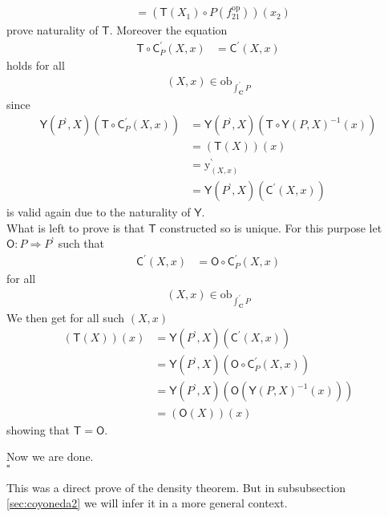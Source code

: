 \begin{prf}
\begin{description}
\begin{align*}
  \\
  &=
  \left(
    \mathsf{T}(X_{1})
    \circ
    P(f_{21}^{\mathrm{op}})
  \right)
  (x_{2})
\end{align*}
prove naturality of $\mathsf{T}$. Moreover the equation
\begin{align*}
  \mathsf{T}
  \circ
  \mathsf{C}_{P}^{\prime}(X,x)
  &=
  \mathsf{C}^{\prime}(X,x)
\end{align*}
holds for all
\begin{align*}
  (X,x)
  \in
  \mathrm{ob}_{\int_{\mathbf{C}}^{\prime}P}
\end{align*}
since
\begin{align*}
  \mathsf{Y}(P^{\backprime},X)
  \left(
    \mathsf{T}
    \circ
    \mathsf{C}_{P}^{\prime}(X,x)
  \right)
  &=
  \mathsf{Y}(P^{\backprime},X)
  \left(
    \mathsf{T}
    \circ
    \mathsf{Y}(P,X)^{-1}(x)
  \right)
  \tag{NT}
  \\
  &=
  (\mathsf{T}(X))(x)
  \\
  &=
  \mathrm{y}_{(X,x)}^{\backprime}
  \\
  &=
  \mathsf{Y}(P^{\backprime},X)
  \left(
    \mathsf{C}^{\prime}(X,x)
  \right)
\end{align*}
is valid again due to the naturality of $\mathsf{Y}$.
\\
What is left to prove is that $\mathsf{T}$ constructed so is unique. For this purpose let $\mathsf{O} \colon P \Rightarrow P^{\backprime}$ such that
\begin{align*}
  \mathsf{C}^{\prime}(X,x)
  &=
  \mathsf{O}
  \circ
  \mathsf{C}_{P}^{\prime}(X,x)
\end{align*}
for all
\begin{align*}
  (X,x)
  \in
  \mathrm{ob}_{\int_{\mathbf{C}}^{\prime}P}
\end{align*}
We then get for all such $(X,x)$
\begin{align*}
  (\mathsf{T}(X))(x)
  &=
  \mathsf{Y}(P^{\backprime},X)
  \left(
    \mathsf{C}^{\prime}(X,x)
  \right)
  \\
  &=
  \mathsf{Y}(P^{\backprime},X)
  \left(
    \mathsf{O}
    \circ
    \mathsf{C}_{P}^{\prime}(X,x)
  \right)
  \\
  &=
  \mathsf{Y}(P^{\backprime},X)
  \left(
    \mathsf{O}
    \left(
      \mathsf{Y}(P,X)^{-1}(x)
    \right)
  \right)
  \tag{NT}
  \\
  &=
  (\mathsf{O}(X))(x)
\end{align*}
showing that $\mathsf{T} = \mathsf{O}$.
\end{description}
Now we are done.
\\
\phantom{proven}
\hfill
$\square$
\end{prf}
This was a direct prove of the density theorem. But in subsubsection \ref{sec:coyoneda2} we will infer it in a more general context.
